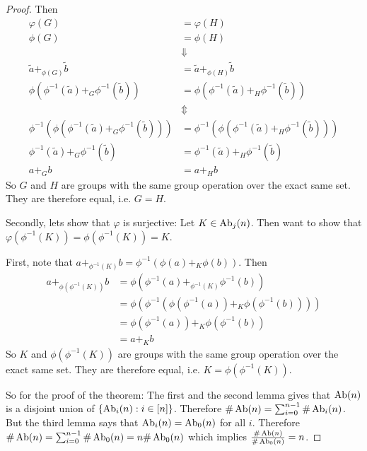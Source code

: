 \begin{proof}
    Then
    \begin{align*}
        \varphi(G) &= \varphi(H) \\
        \phi(G) &= \phi(H) \\
        &\Downarrow \\
        \tilde{a} +_{\phi(G)} \tilde{b} &= \tilde{a} +_{\phi(H)} \tilde{b} \\
        \phi(\phi^{-1}(\tilde{a}) +_G \phi^{-1}(\tilde{b})) &= \phi(\phi^{-1}(\tilde{a}) +_H \phi^{-1}(\tilde{b})) \\
        &\Updownarrow \\
        \phi^{-1}(\phi(\phi^{-1}(\tilde{a}) +_G \phi^{-1}(\tilde{b}))) &= \phi^{-1}(\phi(\phi^{-1}(\tilde{a}) +_H \phi^{-1}(\tilde{b}))) \\
        \phi^{-1}(\tilde{a}) +_G \phi^{-1}(\tilde{b}) &= \phi^{-1}(\tilde{a}) +_H \phi^{-1}(\tilde{b}) \\
        a +_G b &= a +_H b
    \end{align*}
    So \( G \) and \( H \) are groups with the same group operation over the exact same set. They are therefore equal, i.e. \( G = H \).

    Secondly, lets show that \( \varphi \) is surjective: Let \( K \in \operatorname{Ab}_j(n) \). Then want to show that \( \varphi(\phi^{-1}(K)) = \phi(\phi^{-1}(K)) = K \).

    First, note that \( a +_{\phi^{-1}(K)} b = \phi^{-1}(\phi(a) +_K \phi(b)) \). Then
    \begin{align*}
        a +_{\phi(\phi^{-1}(K))} b &= \phi(\phi^{-1}(a) +_{\phi^{-1}(K)} \phi^{-1}(b)) \\
        &= \phi(\phi^{-1}(\phi(\phi^{-1}(a)) +_K \phi(\phi^{-1}(b)) )) \\
        &= \phi(\phi^{-1}(a)) +_K \phi(\phi^{-1}(b)) \\
        &= a +_K b
    \end{align*}
    So \( K \) and \( \phi(\phi^{-1}(K)) \) are groups with the same group operation over the exact same set. They are therefore equal, i.e. \( K = \phi(\phi^{-1}(K)) \).

    So for the proof of the theorem: The first and the second lemma gives that \( \operatorname{Ab}(n) \) is a disjoint union of \( \left\{ \operatorname{Ab}_i(n) : i \in [n] \right\} \). Therefore \( \#\operatorname{Ab}(n) = \sum_{i=0}^{n-1} \#\operatorname{Ab}_i(n) \). But the third lemma says that \( \operatorname{Ab}_i(n) = \operatorname{Ab}_0(n) \) for all \( i \). Therefore \( \#\operatorname{Ab}(n) = \sum_{i=0}^{n-1} \#\operatorname{Ab}_0(n) = n\#\operatorname{Ab}_0(n) \) which implies \( \frac{\#\operatorname{Ab}(n)}{\#\operatorname{Ab}_0(n)} = n \).
\end{proof}

